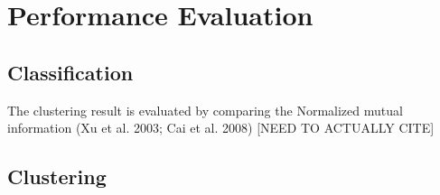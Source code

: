 
\section{Performance Evaluation} 

\subsection{Classification}

The clustering result is evaluated by comparing the Normalized mutual information (Xu et al. 2003; Cai et al. 2008) [NEED TO ACTUALLY CITE]

\subsection{Clustering}

